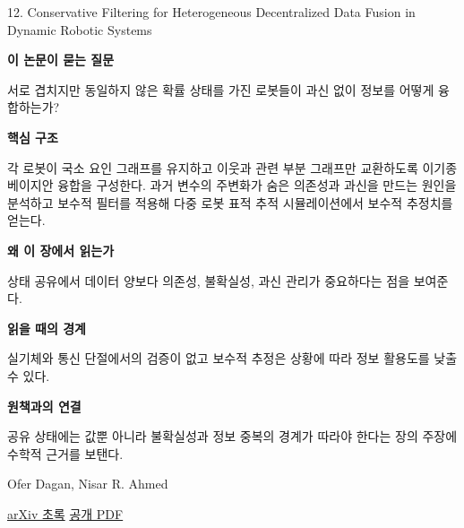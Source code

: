 \documentclass[11pt,openany]{book}
\begin{document}
\begin{termcard}{12. Conservative Filtering for Heterogeneous Decentralized Data Fusion in Dynamic Robotic Systems}

\par

\medskip

{\sffamily\bfseries\color{deepblue} 이 논문이 묻는 질문}\par

서로 겹치지만 동일하지 않은 확률 상태를 가진 로봇들이 과신 없이 정보를 어떻게 융합하는가?

\smallskip

{\sffamily\bfseries\color{deepblue} 핵심 구조}\par

각 로봇이 국소 요인 그래프를 유지하고 이웃과 관련 부분 그래프만 교환하도록 이기종 베이지안 융합을 구성한다. 과거 변수의 주변화가 숨은 의존성과 과신을 만드는 원인을 분석하고 보수적 필터를 적용해 다중 로봇 표적 추적 시뮬레이션에서 보수적 추정치를 얻는다.

\smallskip

{\sffamily\bfseries\color{deepblue} 왜 이 장에서 읽는가}\par

상태 공유에서 데이터 양보다 의존성, 불확실성, 과신 관리가 중요하다는 점을 보여준다.

\smallskip

{\sffamily\bfseries\color{coral} 읽을 때의 경계}\par

실기체와 통신 단절에서의 검증이 없고 보수적 추정은 상황에 따라 정보 활용도를 낮출 수 있다.

\smallskip

{\sffamily\bfseries\color{teal} 원책과의 연결}\par

공유 상태에는 값뿐 아니라 불확실성과 정보 중복의 경계가 따라야 한다는 장의 주장에 수학적 근거를 보탠다.

\medskip

{\footnotesize\color{muted} Ofer Dagan, Nisar R. Ahmed\par

\href{https://arxiv.org/abs/2203.07142}{arXiv 초록} \quad \href{https://arxiv.org/pdf/2203.07142}{공개 PDF}\par}

\end{termcard}
\end{document}
